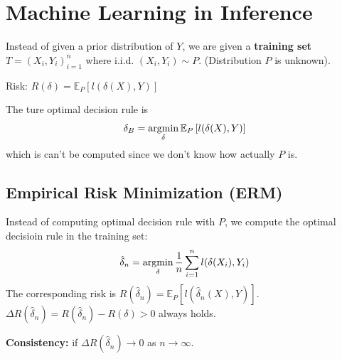 \documentclass[11pt]{elegantbook}
\newcommand{\argmin}{\operatornamewithlimits{argmin}}
\begin{document}
\chapter{Machine Learning in Inference}
Instead of given a prior distribution of $Y$, we are given a \textbf{training set} $T=(X_i,Y_i)_{i=1}^n$ where i.i.d. $(X_i,Y_i)\sim P$. (Distribution $P$ is unknown).

Risk: $R(\delta)=\mathbb{E}_P\left[l(\delta(X),Y)\right]$

The ture optimal decision rule is $$\delta_B=\argmin_\delta \mathbb{E}_P\left[l(\delta(X),Y)\right]$$
which is can't be computed since we don't know how actually $P$ is.

\section{Empirical Risk Minimization (ERM)}
Instead of computing optimal decision rule with $P$, we compute the optimal decisioin rule in the training set:
$$\hat{\delta}_n=\argmin_\delta \frac{1}{n}\sum_{i=1}^nl(\delta(X_i),Y_i)$$
The corresponding risk is $R(\hat{\delta}_n)=\mathbb{E}_P\left[l(\hat{\delta}_n(X),Y)\right]$. $\Delta R(\hat{\delta}_n)=R(\hat{\delta}_n)- R(\delta)>0$ always holds.

\textbf{Consistency:} if $\Delta R(\hat{\delta}_n) \rightarrow 0$ as $n \rightarrow \infty$.
\end{document}
